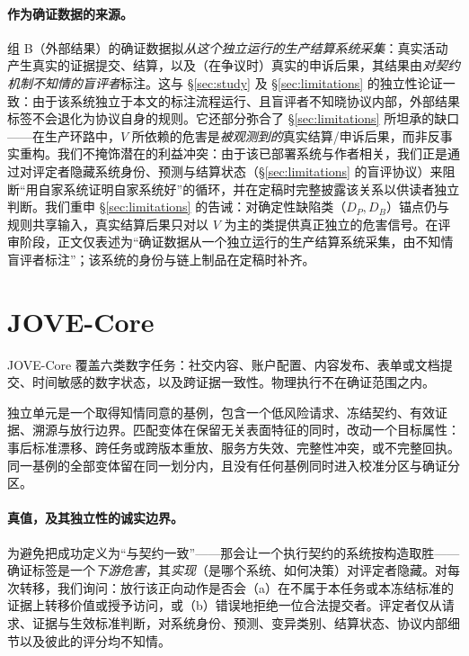 \documentclass[11pt]{ctexart}
\begin{document}
\paragraph{作为确证数据的来源。} 组 B（外部结果）的确证数据拟\emph{从这个独立运行的生产结算系统采集}：真实活动产生真实的证据提交、结算，以及（在争议时）真实的申诉后果，其结果由\emph{对契约机制不知情的盲评者}标注。这与 \S\ref{sec:study} 及 \S\ref{sec:limitations} 的独立性论证一致：由于该系统独立于本文的标注流程运行、且盲评者不知晓协议内部，外部结果标签不会退化为协议自身的规则。它还部分弥合了 \S\ref{sec:limitations} 所坦承的缺口——在生产环路中，$V$ 所依赖的危害是\emph{被观测到的}真实结算/申诉后果，而非反事实重构。我们不掩饰潜在的利益冲突：由于该已部署系统与作者相关，我们正是通过对评定者隐藏系统身份、预测与结算状态（\S\ref{sec:limitations} 的盲评协议）来阻断“用自家系统证明自家系统好”的循环，并在定稿时完整披露该关系以供读者独立判断。我们重申 \S\ref{sec:limitations} 的告诫：对确定性缺陷类（$D_P,D_B$）锚点仍与规则共享输入，真实结算后果只对以 $V$ 为主的类提供真正独立的危害信号。在评审阶段，正文仅表述为“确证数据从一个独立运行的生产结算系统采集，由不知情盲评者标注”；该系统的身份与链上制品在定稿时补齐。

\section{JOVE-Core}
JOVE-Core 覆盖六类数字任务：社交内容、账户配置、内容发布、表单或文档提交、时间敏感的数字状态，以及跨证据一致性。物理执行不在确证范围之内。

独立单元是一个取得知情同意的基例，包含一个低风险请求、冻结契约、有效证据、溯源与放行边界。匹配变体在保留无关表面特征的同时，改动一个目标属性：事后标准漂移、跨任务或跨版本重放、服务方失效、完整性冲突，或不完整回执。同一基例的全部变体留在同一划分内，且没有任何基例同时进入校准分区与确证分区。

\paragraph{真值，及其独立性的诚实边界。} 为避免把成功定义为“与契约一致”——那会让一个执行契约的系统按构造取胜——确证标签是一个\emph{下游危害}，其\emph{实现}（是哪个系统、如何决策）对评定者隐藏。对每次转移，我们询问：放行该正向动作是否会（a）在不属于本任务或本冻结标准的证据上转移价值或授予访问，或（b）错误地拒绝一位合法提交者。评定者仅从请求、证据与生效标准判断，对系统身份、预测、变异类别、结算状态、协议内部细节以及彼此的评分均不知情。
\end{document}
